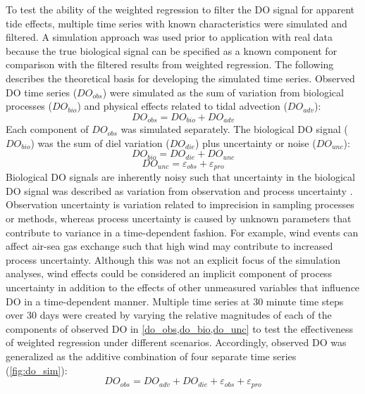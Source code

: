 \documentclass[letterpaper,12pt,oneside]{article}\usepackage[]{graphicx}\usepackage[]{color}
\begin{document}
To test the ability of the weighted regression to filter the \ac{DO} signal for apparent tide effects, multiple time series with known characteristics were simulated and filtered.  A simulation approach was used prior to application with real data because the true biological signal can be specified as a known component for comparison with the filtered results from weighted regression. The following describes the theoretical basis for developing the simulated time series.  Observed \ac{DO} time series ($DO_{obs}$) were simulated as the sum of variation from biological processes ($DO_{bio}$) and physical effects related to tidal advection ($DO_{adv}$):  
\begin{equation} \label{do_obs}
DO_{obs} = DO_{bio} + DO_{adv}
\end{equation}
Each component of $DO_{obs}$ was simulated separately.  The biological \ac{DO} signal ($DO_{bio}$) was the sum of diel variation ($DO_{die}$) plus uncertainty or noise ($DO_{unc}$):
\begin{equation} \label{do_bio} 
DO_{bio} = DO_{die} + DO_{unc}
\end{equation} 
\begin{equation} \label{do_unc}
DO_{unc} = \varepsilon_{obs} + \varepsilon_{pro}
\end{equation}
Biological \ac{DO} signals are inherently noisy \citep{Batt12} such that uncertainty in the biological \ac{DO} signal was described as variation from observation and process uncertainty \citep[$\varepsilon_{obs}$ and $\varepsilon_{pro}$,][]{Hilborn97}. Observation uncertainty is variation related to imprecision in sampling processes or methods, whereas process uncertainty is caused by unknown parameters that contribute to variance in a time-dependent fashion.  For example, wind events can affect air-sea gas exchange \citep{Ziegler98,Caffrey14} such that high wind may contribute to increased process uncertainty.  Although this was not an explicit focus of the simulation analyses, wind effects could be considered an implicit component of process uncertainty in addition to the effects of other unmeasured variables that influence \ac{DO} in a time-dependent manner.  Multiple time series at 30 minute time steps over 30 days were created by varying the relative magnitudes of each of the components of observed \ac{DO} in \cref{do_obs,do_bio,do_unc} to test the effectiveness of weighted regression under different scenarios.  Accordingly, observed \ac{DO} was generalized as the additive combination of four separate time series (\cref{fig:do_sim}):
\begin{equation} \label{do_obs_all}
DO_{obs} = DO_{adv} + DO_{die} + \varepsilon_{obs} + \varepsilon_{pro}
\end{equation} 
\end{document}
